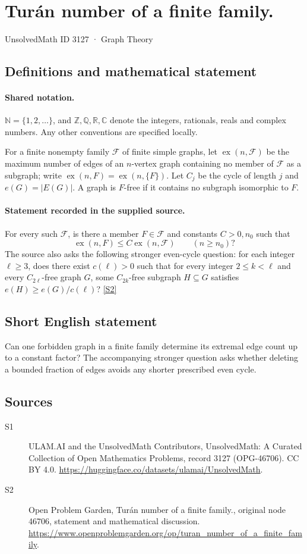 \documentclass[11pt]{article}
\newcommand{\sref}[2]{\hyperlink{source:#1:#2}{[S#2]}}
\begin{document}
\setcounter{section}{3126}
\section{Turán number of a finite family.}\label{3127}
{\small\sffamily UnsolvedMath ID 3127 · Graph Theory}
\subsection{Definitions and mathematical statement}

\paragraph{Shared notation.}$\mathbb N=\{1,2,\ldots\}$, and $\mathbb Z,\mathbb Q,\mathbb R,\mathbb C$ denote the integers, rationals, reals and complex numbers. Any other conventions are specified locally.


For a finite nonempty family $\mathcal F$ of finite simple graphs, let $\operatorname{ex}(n,\mathcal F)$ be the maximum number of edges of an $n$-vertex graph containing no member of $\mathcal F$ as a subgraph; write $\operatorname{ex}(n,F)=\operatorname{ex}(n,\{F\})$. Let $C_j$ be the cycle of length $j$ and $e(G)=|E(G)|$. A graph is $F$-free if it contains no subgraph isomorphic to $F$.
\paragraph{Statement recorded in the supplied source.}
For every such $\mathcal F$, is there a member $F\in\mathcal F$ and constants $C>0,n_0$ such that \[\operatorname{ex}(n,F)\le C\operatorname{ex}(n,\mathcal F)\qquad(n\ge n_0)?\] The source also asks the following stronger even-cycle question: for each integer $\ell\ge3$, does there exist $c(\ell)>0$ such that for every integer $2\le k<\ell$ and every $C_{2\ell}$-free graph $G$, some $C_{2k}$-free subgraph $H\subseteq G$ satisfies $e(H)\ge e(G)/c(\ell)$? \sref{3127}{2}
\subsection{Short English statement}
Can one forbidden graph in a finite family determine its extremal edge count up to a constant factor? The accompanying stronger question asks whether deleting a bounded fraction of edges avoids any shorter prescribed even cycle.
\subsection{Sources}
\begin{description}
\item[\hypertarget{source:3127:1}{S1}] ULAM.AI and the UnsolvedMath Contributors, UnsolvedMath: A Curated Collection of Open Mathematics Problems, record 3127 (OPG-46706). CC BY 4.0. \url{https://huggingface.co/datasets/ulamai/UnsolvedMath}.
\item[\hypertarget{source:3127:2}{S2}] Open Problem Garden, Turán number of a finite family., original node 46706, statement and mathematical discussion. \url{https://www.openproblemgarden.org/op/turan_number_of_a_finite_family}.
\end{description}
\label{end:3127}
\end{document}
